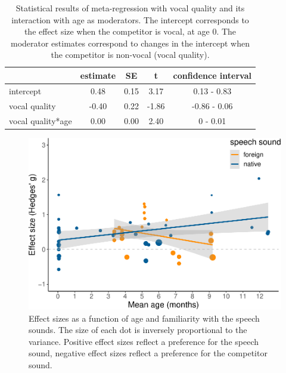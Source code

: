 \documentclass[
  english,
  man]{apa6}
\begin{document}
\begin{table}[tbp]

\begin{center}
\begin{threeparttable}

\caption{\label{tab:TableVocal}Statistical results of meta-regression with vocal quality and its interaction with age as moderators. The intercept corresponds to the effect size when the competitor is vocal, at age 0. The moderator estimates correspond to changes in the intercept when the competitor is non-vocal (vocal quality).}

\begin{tabular}{lcccc}
\toprule
 & estimate & SE & t & confidence interval\\
\midrule
intercept & 0.48 & 0.15 & 3.17 & 0.13 - 0.83\\
vocal quality & -0.40 & 0.22 & -1.86 & -0.86 - 0.06\\
vocal quality*age & 0.00 & 0.00 & 2.40 & 0 - 0.01\\
\bottomrule
\end{tabular}

\end{threeparttable}
\end{center}

\end{table}

\begin{figure}
\centering
\includegraphics{MA_speech_pref_files/figure-latex/lang-1.pdf}
\caption{\label{fig:lang}Effect sizes as a function of age and familiarity with the speech sounds. The size of each dot is inversely proportional to the variance. Positive effect sizes reflect a preference for the speech sound, negative effect sizes reflect a preference for the competitor sound.}
\end{figure}
\end{document}
